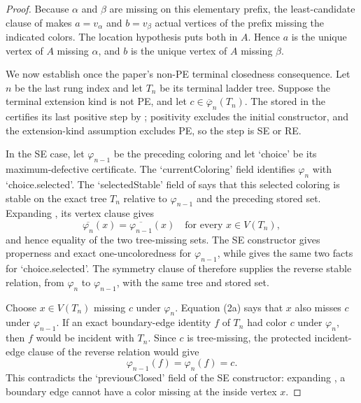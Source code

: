 \begin{proof}
Because $\alpha$ and $\beta$ are missing on this elementary prefix,
the least-candidate clause of
 makes $a=v_\alpha$ and
$b=v_\beta$ actual vertices of the prefix missing the indicated colors.
The location hypothesis puts both in $A$.  Hence $a$ is the unique
vertex of $A$ missing $\alpha$, and $b$ is the unique vertex of $A$
missing $\beta$.

We now establish once the paper's non-PE terminal closedness consequence.
Let $n$ be the last rung index and let $T_n$ be its terminal ladder tree.
Suppose the terminal extension kind is not PE, and let
$c\in\overline\varphi_n(T_n)$.  The  stored in
the  certifies its last positive step by
; positivity excludes the initial
constructor, and the extension-kind assumption excludes PE, so the step
is SE or RE.

In the SE case, let $\varphi_{n-1}$ be the preceding coloring and let
`choice' be its maximum-defective certificate.  The `currentColoring'
field identifies $\varphi_n$ with `choice.selected'.  The
`selectedStable' field of  says that
this selected coloring is stable on the exact tree $T_n$ relative to
$\varphi_{n-1}$ and the preceding stored set.  Expanding
, its vertex clause gives
\[
 \overline{\varphi_n}(x)=\overline{\varphi_{n-1}}(x)
       \quad\text{for every }x\in V(T_n),                    \tag{2a}
\]
and hence equality of the two tree-missing sets.  The SE constructor
gives properness and exact one-uncoloredness for $\varphi_{n-1}$, while
 gives the same two facts for
`choice.selected'.  The symmetry clause of  therefore
supplies the reverse stable relation, from $\varphi_n$ to
$\varphi_{n-1}$, with the same tree and stored set.

Choose $x\in V(T_n)$ missing $c$ under $\varphi_n$.  Equation (2a) says
that $x$ also misses $c$ under $\varphi_{n-1}$.  If an exact boundary-edge
identity $f$ of $T_n$ had color $c$ under $\varphi_n$, then $f$ would be
incident with $T_n$.  Since $c$ is tree-missing, the protected
incident-edge clause of the reverse  relation
would give
\[
                    \varphi_{n-1}(f)=\varphi_n(f)=c.
\]
This contradicts the `previousClosed' field of the SE constructor:
expanding , a boundary edge cannot have
a color missing at the inside vertex $x$.


\end{proof}
